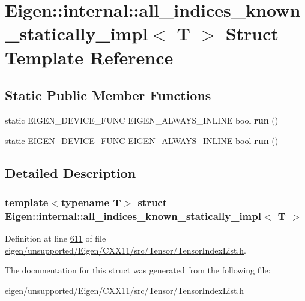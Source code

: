 \hypertarget{struct_eigen_1_1internal_1_1all__indices__known__statically__impl}{}\section{Eigen\+:\+:internal\+:\+:all\+\_\+indices\+\_\+known\+\_\+statically\+\_\+impl$<$ T $>$ Struct Template Reference}
\label{struct_eigen_1_1internal_1_1all__indices__known__statically__impl}
\subsection*{Static Public Member Functions}
\begin{DoxyCompactItemize}
\item 
\mbox{\label{struct_eigen_1_1internal_1_1all__indices__known__statically__impl_a904a8682d5a739d05bb8a73c5c9e442c}} 
static E\+I\+G\+E\+N\+\_\+\+D\+E\+V\+I\+C\+E\+\_\+\+F\+U\+NC E\+I\+G\+E\+N\+\_\+\+A\+L\+W\+A\+Y\+S\+\_\+\+I\+N\+L\+I\+NE bool {\bfseries run} ()
\item 
\mbox{\label{struct_eigen_1_1internal_1_1all__indices__known__statically__impl_a904a8682d5a739d05bb8a73c5c9e442c}} 
static E\+I\+G\+E\+N\+\_\+\+D\+E\+V\+I\+C\+E\+\_\+\+F\+U\+NC E\+I\+G\+E\+N\+\_\+\+A\+L\+W\+A\+Y\+S\+\_\+\+I\+N\+L\+I\+NE bool {\bfseries run} ()
\end{DoxyCompactItemize}


\subsection{Detailed Description}
\subsubsection*{template$<$typename T$>$\newline
struct Eigen\+::internal\+::all\+\_\+indices\+\_\+known\+\_\+statically\+\_\+impl$<$ T $>$}



Definition at line \hyperlink{eigen_2unsupported_2_eigen_2_c_x_x11_2src_2_tensor_2_tensor_index_list_8h_source_l00611}{611} of file \hyperlink{eigen_2unsupported_2_eigen_2_c_x_x11_2src_2_tensor_2_tensor_index_list_8h_source}{eigen/unsupported/\+Eigen/\+C\+X\+X11/src/\+Tensor/\+Tensor\+Index\+List.\+h}.



The documentation for this struct was generated from the following file\+:\begin{DoxyCompactItemize}
\item 
eigen/unsupported/\+Eigen/\+C\+X\+X11/src/\+Tensor/\+Tensor\+Index\+List.\+h\end{DoxyCompactItemize}
